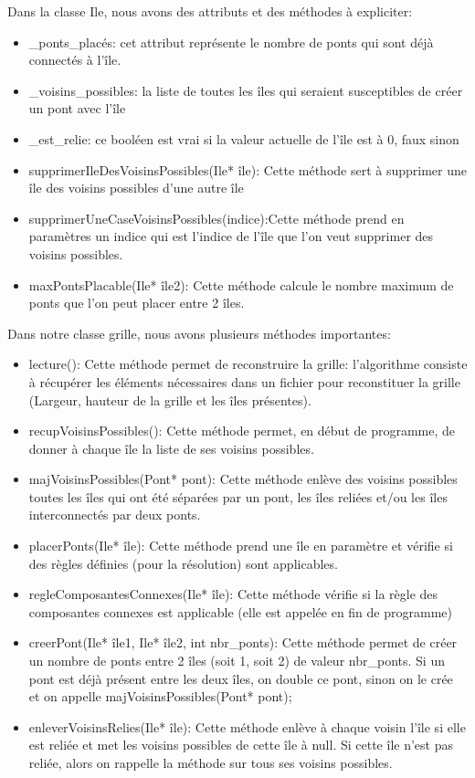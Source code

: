 \documentclass[french]{article}
\begin{document}
 Dans la classe Ile, nous avons des attributs et des méthodes à expliciter:
 \begin{itemize}
    \item \_ponts\_placés: cet attribut représente le nombre de ponts qui sont déjà connectés à l'île.
    \item \_voisins\_possibles: la liste de toutes les îles qui seraient susceptibles de créer un pont avec l'île
    \item \_est\_relie: ce booléen est vrai si la valeur actuelle de l'île est à 0, faux sinon
    \item supprimerIleDesVoisinsPossibles(Ile* île): Cette méthode sert à supprimer une île des voisins possibles d'une autre île
    \item supprimerUneCaseVoisinsPossibles(indice):Cette méthode prend en paramètres un indice qui est l'indice de l'île que l'on veut supprimer des voisins possibles.
    \item maxPontsPlacable(Ile* île2): Cette méthode calcule le nombre maximum de ponts que l'on peut placer entre 2 îles. \\
\end{itemize}
 Dans notre classe grille, nous avons plusieurs méthodes importantes:
 \begin{itemize}
     \item lecture(): Cette méthode permet de reconstruire la grille: l'algorithme consiste à récupérer les éléments nécessaires dans un fichier pour reconstituer la grille (Largeur, hauteur de la grille et les îles présentes).
     \item recupVoisinsPossibles(): Cette méthode permet, en début de programme, de donner à chaque île la liste de ses voisins possibles.
     \item majVoisinsPossibles(Pont* pont): Cette méthode enlève des voisins possibles toutes les îles qui ont été séparées par un pont, les îles reliées et/ou les îles interconnectés par deux ponts.
     \item placerPonts(Ile* île): Cette méthode prend une île en paramètre et vérifie si des règles définies (pour la résolution) sont applicables.
     \item regleComposantesConnexes(Ile* île): Cette méthode vérifie si la règle des composantes connexes est applicable (elle est appelée en fin de programme)
     \item creerPont(Ile* île1, Ile* île2, int nbr\_ponts): Cette méthode permet de créer un nombre de ponts entre 2 îles (soit 1, soit 2) de valeur nbr\_ponts. Si un pont est déjà présent entre les deux îles, on double ce pont, sinon on le crée et on appelle majVoisinsPossibles(Pont* pont);
     \item enleverVoisinsRelies(Ile* île): Cette méthode enlève à chaque voisin l'île si elle est reliée et met les voisins possibles de cette île à null. Si cette île n'est pas reliée, alors on rappelle la méthode sur tous ses voisins possibles.
 \end{itemize}
\end{document}
